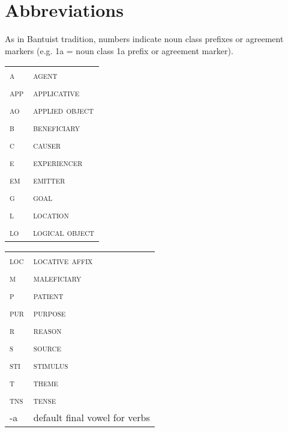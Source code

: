 \documentclass[output=paper]{langsci/langscibook}
\begin{document}
\section*{Abbreviations}

As in Bantuist tradition, numbers indicate noun class prefixes or agreement markers (e.g. 1a = noun class 1a prefix or agreement marker).
\medskip

\begin{tabularx}{.45\textwidth}{lX}
\textsc{a} & \textsc{agent} \\
\textsc{app} & \textsc{applicative} \\
\textsc{ao} & \textsc{applied object}  \\
\textsc{b} & \textsc{beneficiary} \\
\textsc{c} & \textsc{causer} \\
\textsc{e} & \textsc{experiencer} \\
\textsc{em} & \textsc{emitter} \\
\textsc{g} & \textsc{goal} \\
\textsc{l} & \textsc{location} \\
\textsc{lo} & \textsc{logical object}  \\
\end{tabularx}
\begin{tabularx}{.45\textwidth}{lX}
\textsc{loc} & \textsc{locative affix} \\
\textsc{m} & \textsc{maleficiary} \\
\textsc{p} & \textsc{patient} \\
\textsc{pur} & \textsc{purpose}  \\
\textsc{r} & \textsc{reason} \\
\textsc{s} & \textsc{source} \\
\textsc{sti} & \textsc{stimulus} \\
\textsc{t} & \textsc{theme} \\
\textsc{tns} & \textsc{tense}  \\
-a & default final vowel for verbs \\
\end{tabularx}

{\sloppy
\printbibliography[heading=subbibliography,notkeyword=this]
}
\end{document}
